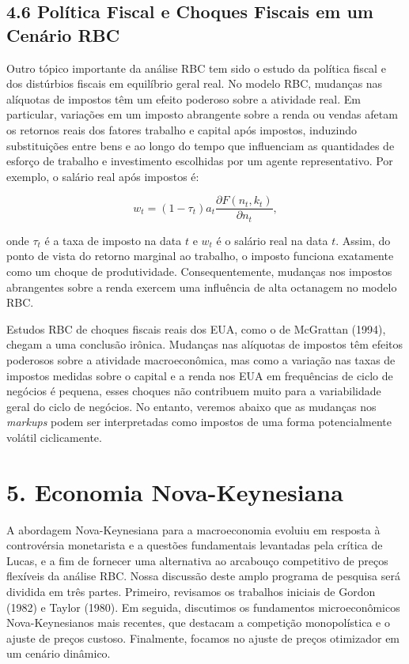 \documentclass[12pt]{article}
\begin{document}
\subsection{4.6 Política Fiscal e Choques Fiscais em um Cenário RBC}

Outro tópico importante da análise RBC tem sido o estudo da política fiscal e dos distúrbios fiscais em equilíbrio geral real. No modelo RBC, mudanças nas alíquotas de impostos têm um efeito poderoso sobre a atividade real. Em particular, variações em um imposto abrangente sobre a renda ou vendas afetam os retornos reais dos fatores trabalho e capital após impostos, induzindo substituições entre bens e ao longo do tempo que influenciam as quantidades de esforço de trabalho e investimento escolhidas por um agente representativo. Por exemplo, o salário real após impostos é:

\begin{equation}
w_t = (1 - \tau_t) a_t \frac{\partial F(n_t, k_t)}{\partial n_t}, \tag{4.3}
\end{equation}

onde $\tau_t$ é a taxa de imposto na data $t$ e $w_t$ é o salário real na data $t$. Assim, do ponto de vista do retorno marginal ao trabalho, o imposto funciona exatamente como um choque de produtividade. Consequentemente, mudanças nos impostos abrangentes sobre a renda exercem uma influência de alta octanagem no modelo RBC.

Estudos RBC de choques fiscais reais dos EUA, como o de McGrattan (1994), chegam a uma conclusão irônica. Mudanças nas alíquotas de impostos têm efeitos poderosos sobre a atividade macroeconômica, mas como a variação nas taxas de impostos medidas sobre o capital e a renda nos EUA em frequências de ciclo de negócios é pequena, esses choques não contribuem muito para a variabilidade geral do ciclo de negócios. No entanto, veremos abaixo que as mudanças nos \textit{markups} podem ser interpretadas como impostos de uma forma potencialmente volátil ciclicamente.

\section{5. Economia Nova-Keynesiana}

A abordagem Nova-Keynesiana para a macroeconomia evoluiu em resposta à controvérsia monetarista e a questões fundamentais levantadas pela crítica de Lucas, e a fim de fornecer uma alternativa ao arcabouço competitivo de preços flexíveis da análise RBC. Nossa discussão deste amplo programa de pesquisa será dividida em três partes. Primeiro, revisamos os trabalhos iniciais de Gordon (1982) e Taylor (1980). Em seguida, discutimos os fundamentos microeconômicos Nova-Keynesianos mais recentes, que destacam a competição monopolística e o ajuste de preços custoso. Finalmente, focamos no ajuste de preços otimizador em um cenário dinâmico.
\end{document}
